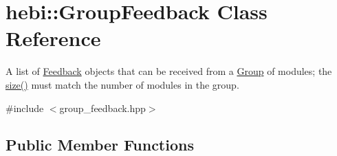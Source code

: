 \hypertarget{classhebi_1_1GroupFeedback}{}\section{hebi\+:\+:Group\+Feedback Class Reference}
\label{classhebi_1_1GroupFeedback}


A list of \hyperlink{classhebi_1_1Feedback}{Feedback} objects that can be received from a \hyperlink{classhebi_1_1Group}{Group} of modules; the \hyperlink{classhebi_1_1GroupFeedback_adbf31eb50d00db7f286a4888f0d99dc6}{size()} must match the number of modules in the group.  




{\ttfamily \#include $<$group\+\_\+feedback.\+hpp$>$}

\subsection*{Public Member Functions}
